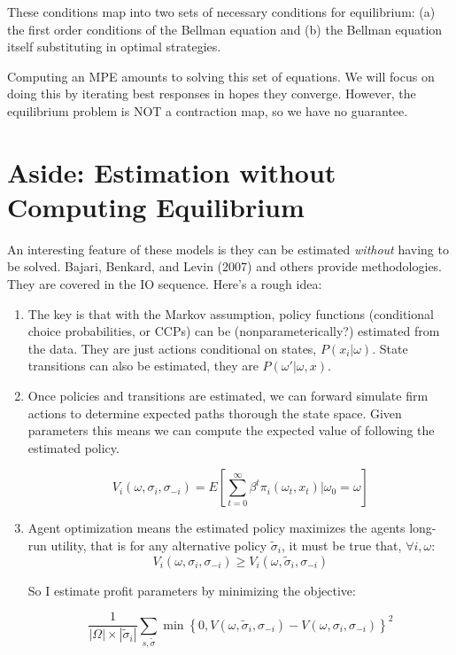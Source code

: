 \documentclass[twoside]{article}
\begin{document}
 These conditions map into two sets of necessary conditions for equilibrium: (a) the first order conditions of the Bellman equation and (b) the Bellman equation itself substituting in optimal strategies. 
 
Computing an MPE amounts to solving this set of equations. We will focus on doing this by iterating best responses in hopes they converge.  However, the equilibrium problem is NOT a contraction map, so we have no guarantee. 

\section{Aside: Estimation without Computing Equilibrium}

An interesting feature of these models is they can be estimated \emph{without} having to be solved.  Bajari, Benkard, and Levin (2007) and others provide methodologies. They are covered in the IO sequence.  Here's a rough idea: 

\begin{enumerate}
\item The key is that with the Markov assumption, policy functions (conditional choice probabilities, or CCPs) can be (nonparameterically?) estimated from the data. They are just actions conditional on states, $P(x_i|\omega)$. State transitions can also be estimated, they are $P(\omega'|\omega, x)$. 

\item Once policies and transitions are estimated, we can forward simulate firm actions to determine expected paths thorough the state space. Given parameters this means we can compute the expected value of following the estimated policy. 

$$V_i(\omega, \sigma_i, \sigma_{-i}) = E \left[ \sum_{t = 0}^\infty \beta^t \pi_i(\omega_t, x_t) | \omega_0 = \omega \right] $$

\item Agent optimization means the estimated policy maximizes the agents long-run utility, that is for any alternative policy $\tilde{\sigma}_i$, it must be true that, $\forall i, \omega$: 
$$V_i(\omega, \sigma_i, \sigma_{-i}) \geq V_i(\omega, \tilde{\sigma}_i, \sigma_{-i})  $$

So I estimate profit parameters by minimizing the objective:

$$  \frac{1}{|\Omega | \times | \tilde{\sigma}_i | } \sum_{s, \tilde{\sigma}} \min \left\{ 0, V(\omega, \tilde{\sigma}_i, \sigma_{-i}) - V(\omega, \sigma_i, \sigma_{-i}) \right\}^2 $$

\end{enumerate}
\end{document}
